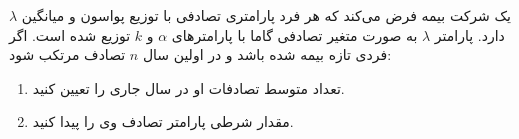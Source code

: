 \problem{}
یک شرکت بیمه فرض می‌کند که هر فرد پارامتری تصادفی با توزیع پواسون و میانگین $\lambda$ دارد. پارامتر $\lambda$ به صورت متغیر تصادفی گاما با پارامترهای $\alpha$ و $k$ توزیع شده است. اگر فردی تازه بیمه شده باشد و در اولین سال $n$ تصادف مرتکب شود:
\begin{enumerate}
    \item تعداد متوسط تصادفات او در سال جاری را تعیین کنید.
    \item مقدار شرطی پارامتر تصادف وی را پیدا کنید.
\end{enumerate}
